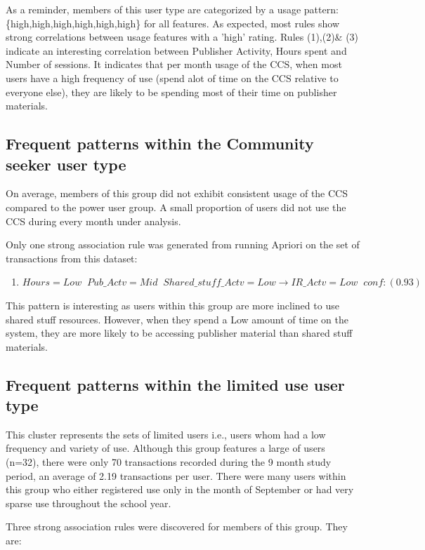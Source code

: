 \documentclass{acm_proc_article-sp}
\begin{document}
As a reminder, members of this user type  are categorized by a usage pattern: \{high,high,high,high,high,high\} for all features.
As expected, most rules show strong correlations between usage features with a 'high' rating.
Rules (1),(2)\& (3) indicate an interesting correlation between Publisher Activity, Hours spent and Number of sessions. It indicates that per month usage of the CCS, when most users have a high frequency of use (spend alot of time on the CCS relative to everyone else), they are likely to be spending most of their time on publisher materials.

\subsection {Frequent patterns within the Community seeker user type}
On average, members of this group did not exhibit consistent usage of the CCS compared to the power user group. A small proportion of users did not use the CCS during every month under analysis.

Only one strong association rule was generated from running Apriori on the set of transactions from this dataset:

\begin{enumerate}
\item $Hours=Low \;\; Pub\_Actv=Mid \;\; Shared\_stuff\_Actv=Low  \longrightarrow IR\_Actv=Low  \;\;  conf:(0.93)$
\end{enumerate}

This pattern is interesting as users within this group are more inclined to use shared stuff resources. However, when they spend a Low amount of time on the system, they are more likely to be accessing publisher material than shared stuff materials.

\subsection {Frequent patterns within the limited use user type}
This cluster represents the sets of limited users i.e., users whom had a low frequency and variety of use. 
Although this group features a large of users (n=32), there were only 70 transactions recorded during the 9 month study period, an average of 2.19 transactions per user. There were many users within this group who either registered use only in the month of September or had very sparse use throughout the school year.

Three strong association rules were discovered for members of this group. They are:
\end{document}
